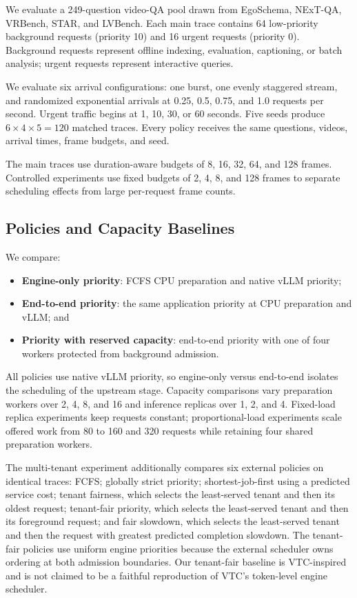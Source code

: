 \documentclass[sigconf,review,anonymous]{acmart}
\begin{document}
We evaluate a 249-question video-QA pool drawn from EgoSchema, NExT-QA,
VRBench, STAR, and LVBench. Each main trace contains 64 low-priority
background requests (priority 10) and 16 urgent requests (priority 0).
Background requests represent offline indexing, evaluation, captioning, or
batch analysis; urgent requests represent interactive queries.

We evaluate six arrival configurations: one burst, one evenly staggered
stream, and randomized exponential arrivals at 0.25, 0.5, 0.75, and 1.0
requests per second. Urgent traffic begins at 1, 10, 30, or 60 seconds. Five
seeds produce $6\times4\times5=120$ matched traces. Every policy receives the
same questions, videos, arrival times, frame budgets, and seed.

The main traces use duration-aware budgets of 8, 16, 32, 64, and 128 frames.
Controlled experiments use fixed budgets of 2, 4, 8, and 128 frames to
separate scheduling effects from large per-request frame counts.

\subsection{Policies and Capacity Baselines}

We compare:

\begin{itemize}
    \item \textbf{Engine-only priority}: FCFS CPU preparation and native vLLM
    priority;
    \item \textbf{End-to-end priority}: the same application priority at CPU
    preparation and vLLM; and
    \item \textbf{Priority with reserved capacity}: end-to-end priority with
    one of four workers protected from background admission.
\end{itemize}

All policies use native vLLM priority, so engine-only versus end-to-end
isolates the scheduling of the upstream stage. Capacity comparisons vary
preparation workers over 2, 4, 8, and 16 and inference replicas over 1, 2, and
4. Fixed-load replica experiments keep requests constant; proportional-load
experiments scale offered work from 80 to 160 and 320 requests while retaining
four shared preparation workers.

The multi-tenant experiment additionally compares six external policies on
identical traces: FCFS; globally strict priority; shortest-job-first using a
predicted service cost; tenant fairness, which selects the least-served tenant
and then its oldest request; tenant-fair priority, which selects the
least-served tenant and then its foreground request; and fair slowdown, which
selects the least-served tenant and then the request with greatest predicted
completion slowdown. The tenant-fair policies use uniform engine priorities
because the external scheduler owns ordering at both admission boundaries.
Our tenant-fair baseline is VTC-inspired and is not claimed to be a faithful
reproduction of VTC's token-level engine scheduler.
\end{document}
